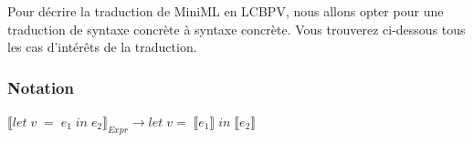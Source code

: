 \documentclass[12pt]{article}
\begin{document}
Pour décrire la traduction de MiniML en LCBPV, nous allons opter pour une traduction de syntaxe concrète à syntaxe concrète.
Vous trouverez ci-dessous tous les cas d'intérêts de la traduction.

\newcommand{\translateNode}[2]{\llbracket #1 \rrbracket_{#2}}
\newcommand{\translateResult}[1]{\llbracket #1 \rrbracket}
\newcommand{\isElemMiniML}[1]{\; \textcolor{Maroon}{#1} \;}
\newcommand{\isElemLCBPV}[1]{\textcolor{ForestGreen}{#1}}
\newcommand{\spaced}[1]{\; #1 \;}
\newcommand{\Tab}{\quad \quad \quad \quad \quad \quad \;}

\pagebreak
\hypertarget{notation}{%
      \subsubsection*{Notation}\label{notation}}
$ \translateNode{let \; v \; = \; e_1 \; in \; e_2}{Expr}  \rightarrow let \; v = \; \translateResult{e_1} \; in \; \translateResult{e_2}$
\end{document}
